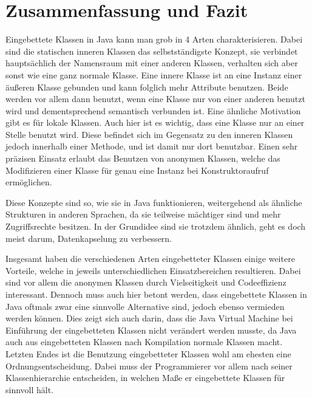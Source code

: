 \chapter{Zusammenfassung und Fazit}

Eingebettete Klassen in Java kann man grob in 4 Arten charakterisieren.
Dabei sind die statischen inneren Klassen das selbstständigste Konzept, sie verbindet hauptsächlich der Namensraum mit einer anderen Klassen, verhalten sich aber sonst wie eine ganz normale Klasse.
Eine innere Klasse ist an eine Instanz einer äußeren Klasse gebunden und kann folglich mehr Attribute benutzen.
Beide werden vor allem dann benutzt, wenn eine Klasse nur von einer anderen benutzt wird und dementsprechend semantisch verbunden ist.
Eine ähnliche Motivation gibt es für lokale Klassen. Auch hier ist es wichtig, dass eine Klasse nur an einer Stelle benutzt wird.
Diese befindet sich im Gegensatz zu den inneren Klassen jedoch innerhalb einer Methode, und ist damit nur dort benutzbar.
Einen sehr präzisen Einsatz erlaubt das Benutzen von anonymen Klassen, welche das Modifizieren einer Klasse für genau eine Instanz bei Konstruktoraufruf ermöglichen.

Diese Konzepte sind so, wie sie in Java funktionieren, weitergehend als ähnliche Strukturen in anderen Sprachen, da sie teilweise mächtiger sind und mehr Zugriffsrechte besitzen.
In der Grundidee sind sie trotzdem ähnlich, geht es doch meist darum, Datenkapselung zu verbessern.

Insgesamt haben die verschiedenen Arten eingebetteter Klassen einige weitere Vorteile, welche in jeweils unterschiedlichen Einsatzbereichen resultieren.
Dabei sind vor allem die anonymen Klassen durch Vielseitigkeit und Codeeffizienz interessant.
Dennoch muss auch hier betont werden, dass eingebettete Klassen in Java oftmals zwar eine sinnvolle Alternative sind, jedoch ebenso vermieden werden können.
Dies zeigt sich auch darin, dass die Java Virtual Machine bei Einführung der eingebetteten Klassen nicht verändert werden musste, da Java auch aus eingebetteten Klassen nach Kompilation normale Klassen macht.
Letzten Endes ist die Benutzung eingebetteter Klassen wohl am ehesten eine Ordnungsentscheidung.
Dabei muss der Programmierer vor allem nach seiner Klassenhierarchie entscheiden,
in welchen Maße er eingebettete Klassen für sinnvoll hält.
